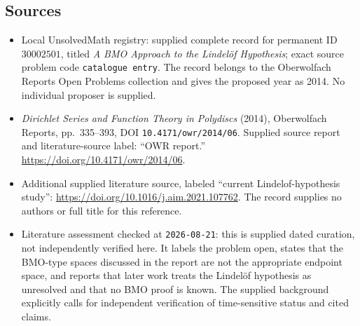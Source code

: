 \documentclass[11pt]{article}
\begin{document}
\subsection{Sources}
\begin{itemize}
\item Local UnsolvedMath registry: supplied complete record for permanent ID \(30002501\), titled \emph{A BMO Approach to the Lindel\"of Hypothesis}; exact source problem code \texttt{catalogue entry}. The record belongs to the Oberwolfach Reports Open Problems collection and gives the proposed year as 2014. No individual proposer is supplied.
\item \emph{Dirichlet Series and Function Theory in Polydiscs} (2014), Oberwolfach Reports, pp.\ 335--393, DOI \texttt{10.4171/owr/2014/06}. Supplied source report and literature-source label: ``OWR report.'' \url{https://doi.org/10.4171/owr/2014/06}.
\item Additional supplied literature source, labeled ``current Lindelof-hypothesis study'': \url{https://doi.org/10.1016/j.aim.2021.107762}. The record supplies no authors or full title for this reference.
\item Literature assessment checked at \texttt{2026-08-21}: this is supplied dated curation, not independently verified here. It labels the problem open, states that the BMO-type spaces discussed in the report are not the appropriate endpoint space, and reports that later work treats the Lindel\"of hypothesis as unresolved and that no BMO proof is known. The supplied background explicitly calls for independent verification of time-sensitive status and cited claims.
\end{itemize}
\end{document}
